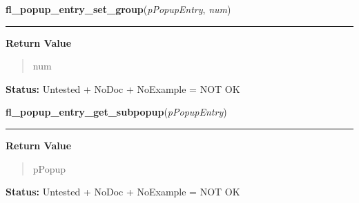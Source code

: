     \label{xformslib:library:fl_popup_entry_set_group}

    \vspace{0.5ex}

\hspace{.8\funcindent}\begin{boxedminipage}{\funcwidth}

    \raggedright \textbf{fl\_popup\_entry\_set\_group}(\textit{pPopupEntry}, \textit{num})

    \vspace{-1.5ex}

    \rule{\textwidth}{0.5\fboxrule}
\setlength{\parskip}{2ex}
\setlength{\parskip}{1ex}
      \textbf{Return Value}
    \vspace{-1ex}

      \begin{quote}
      num

      \end{quote}

\textbf{Status:} Untested + NoDoc + NoExample = NOT OK



    \end{boxedminipage}

    \label{xformslib:library:fl_popup_entry_get_subpopup}

    \vspace{0.5ex}

\hspace{.8\funcindent}\begin{boxedminipage}{\funcwidth}

    \raggedright \textbf{fl\_popup\_entry\_get\_subpopup}(\textit{pPopupEntry})

    \vspace{-1.5ex}

    \rule{\textwidth}{0.5\fboxrule}
\setlength{\parskip}{2ex}
\setlength{\parskip}{1ex}
      \textbf{Return Value}
    \vspace{-1ex}

      \begin{quote}
      pPopup

      \end{quote}

\textbf{Status:} Untested + NoDoc + NoExample = NOT OK



    \end{boxedminipage}


